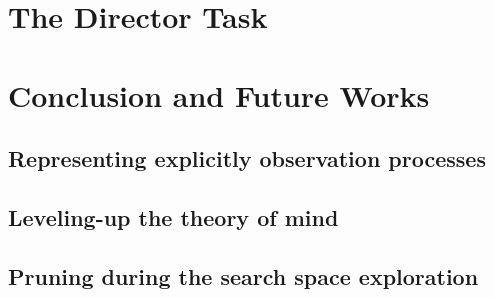 \documentclass[a4paper,11pt,twoside]{StyleThese}
\begin{document}
\section{The Director Task}

\section{Conclusion and Future Works}
\subsection{Representing explicitly observation processes}

\subsection{Leveling-up the theory of mind}

\subsection{Pruning during the search space exploration}

\ifdefined{}
\else


\end{document}

